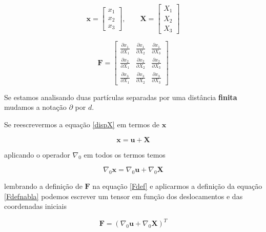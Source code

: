 \begin{equation}
	\mathbf{x} = \left[\begin{array}{ccc}
		x_1 \\ x_2 \\ x_3
	\end{array}\right],
	\qquad
	\mathbf{X} = \left[\begin{array}{ccc}
		X_1 \\ X_2 \\ X_3
	\end{array}\right]
\end{equation}

\begin{equation}
	\mathbf{F} = 
	\left[\begin{array}{ccc}
		\frac{\partial x_1}{\partial X_1} 
		& \frac{\partial x_1}{\partial X_2}
		& \frac{\partial x_1}{\partial X_3}
		\\
		\frac{\partial x_2}{\partial X_1} 
		& \frac{\partial x_2}{\partial X_2}
		& \frac{\partial x_2}{\partial X_3}
		\\
		\frac{\partial x_3}{\partial X_1} 
		& \frac{\partial x_3}{\partial X_2}
		& \frac{\partial x_3}{\partial X_3}
	\end{array}\right]
\end{equation}

Se estamos analisando duas partículas separadas por uma distância \textbf{finita} mudamos a notação $\partial$ por $d$.

Se reescrevermos a equação \ref{dispX} em termos de $\mathbf{x}$

\begin{equation}
	\mathbf{x} =  \mathbf{u} + \mathbf{X}
\end{equation}

aplicando o operador $\nabla_0$ em todos os termos temos

\begin{equation}
	\nabla_0 \mathbf{x} =  \nabla_0 \mathbf{u} + \nabla_0 \mathbf{X} 
	\label{Fdefnabla}
\end{equation}

lembrando a definição de $\mathbf{F}$ na equação \ref{Fdef} e aplicarmos a definição da equação \ref{Fdefnabla} podemos escrever um tensor em função dos deslocamentos e das coordenadas iniciais

\begin{equation}
	\mathbf{F} = (\nabla_0 \mathbf{u} + \nabla_0 \mathbf{X})^T
\end{equation}
  

